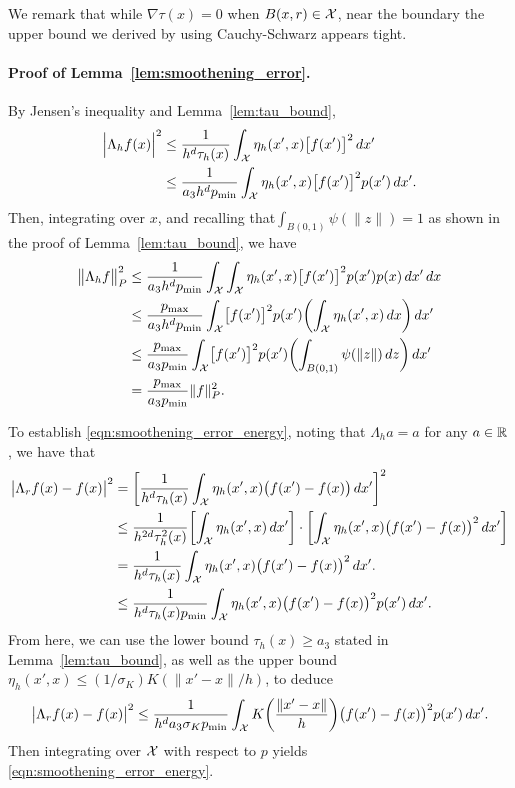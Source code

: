 We remark that while $\nabla\tau(x) = 0$ when $B(x,r) \in \mathcal{X}$, near the boundary the upper bound we derived by using Cauchy-Schwarz appears tight. 

\paragraph{Proof of Lemma~\ref{lem:smoothening_error}.}
By Jensen's inequality and Lemma~\ref{lem:tau_bound},
\begin{align*}
\Bigl|\Lambda_hf(x)\Bigr|^2 & \leq \frac{1}{h^d\tau_h(x)}\int_{\mathcal{X}} \eta_h(x',x) \bigl[f(x')\bigr]^2 \,dx' \\
& \leq \frac{1}{a_3 h^dp_{\min}}\int_{\mathcal{X}} \eta_h(x',x) \bigl[f(x')\bigr]^2 p(x') \,dx'.
\end{align*}
Then, integrating over $x$, and recalling that$\int_{B(0,1)} \psi(\|z\|) = 1$ as shown in the proof of Lemma~\ref{lem:tau_bound}, we have
\begin{align*}
\bigl\|\Lambda_hf\bigr\|_{P}^2 & \leq \frac{1}{a_3h^d p_{\min}} \int_{\mathcal{X}} \int_{\mathcal{X}} \eta_h(x',x) \bigl[f(x')\bigr]^2 p(x') p(x) \,dx' \,dx \\ 
& \leq \frac{p_{\max}}{a_3h^dp_{\min}} \int_{\mathcal{X}} \bigl[f(x')\bigr]^2 p(x') \biggl(\int_{\mathcal{X}} \eta_h(x',x) \,dx\biggr) \,dx' \\
& \leq \frac{p_{\max}}{a_3p_{\min}} \int_{\mathcal{X}} \bigl[f(x')\bigr]^2 p(x') \biggl(\int_{B(0,1)} \psi(\|z\|) \,dz\biggr) \,dx' \\
& = \frac{p_{\max}}{a_3p_{\min}} \|f\|_{P}^2.
\end{align*}

To establish \eqref{eqn:smoothening_error_energy}, noting that $\Lambda_ha = a$ for any $a \in \mathbb{R}$, we have that
\begin{align*}
\bigl|\Lambda_rf(x) - f(x)\bigr|^2 & = \biggl[\frac{1}{h^d\tau_h(x)} \int_{\mathcal{X}} \eta_h(x',x) \bigl(f(x') - f(x)\bigr) \,dx'\biggr]^2 \\
& \leq \frac{1}{h^{2d} \tau_h^2(x)} \biggl[\int_{\mathcal{X}} \eta_h(x',x) \,dx'\biggr] \cdot \biggl[\int_{\mathcal{X}} \eta_h(x',x) \bigl(f(x') - f(x)\bigr)^2 \,dx'\biggr] \\
& = \frac{1}{h^d \tau_h(x)} \int_{\mathcal{X}} \eta_h(x',x) \bigl(f(x') - f(x)\bigr)^2 \,dx'. \\
& \leq \frac{1}{h^d \tau_h(x) p_{\min}} \int_{\mathcal{X}} \eta_h(x',x) \bigl(f(x') - f(x)\bigr)^2 p(x') \,dx'.
\end{align*}
From here, we can use the lower bound $\tau_h(x) \geq a_3$ stated in Lemma~\ref{lem:tau_bound}, as well as the upper bound $\eta_h(x',x) \leq (1/\sigma_K) K(\|x' - x\|/h)$, to deduce
\begin{equation*}
\bigl|\Lambda_rf(x) - f(x)\bigr|^2 \leq \frac{1}{h^{d} a_3 \sigma_K p_{\min}} \int_{\mathcal{X}} K\biggl(\frac{\|x' - x\|}{h}\biggr) \bigl(f(x') - f(x)\bigr)^2 p(x') \,dx'.
\end{equation*}
Then integrating over $\mathcal{X}$ with respect to $p$ yields \eqref{eqn:smoothening_error_energy}.

